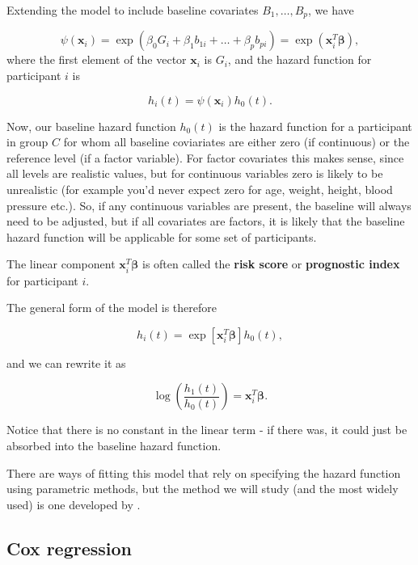 \documentclass[
  openany]{book}
\theoremstyle{definition}
\theoremstyle{definition}
\theoremstyle{definition}
\theoremstyle{definition}
\theoremstyle{remark}
\begin{document}
Extending the model to include baseline covariates \(B_1,\ldots,B_p\), we have

\[\psi\left(\mathbf{x}_i\right) = \exp\left(\beta_0 G_i + \beta_1b_{1i} + \ldots + \beta_p b_{pi}\right) = \exp\left(\mathbf{x}_i^T \boldsymbol\beta\right),\]
where the first element of the vector \(\mathbf{x}_i\) is \(G_i\), and the hazard function for participant \(i\) is

\[h_i\left(t\right) = \psi\left(\mathbf{x}_i\right)h_0\left(t\right). \]

Now, our baseline hazard function \(h_0\left(t\right)\) is the hazard function for a participant in group \(C\) for whom all baseline coviariates are either zero (if continuous) or the reference level (if a factor variable). For factor covariates this makes sense, since all levels are realistic values, but for continuous variables zero is likely to be unrealistic (for example you'd never expect zero for age, weight, height, blood pressure etc.). So, if any continuous variables are present, the baseline will always need to be adjusted, but if all covariates are factors, it is likely that the baseline hazard function will be applicable for some set of participants.

The linear component \(\mathbf{x}_i^T\boldsymbol\beta\) is often called the \textbf{risk score} or \textbf{prognostic index} for participant \(i\).

The general form of the model is therefore

\begin{equation}
h_i\left(t\right) = \exp\left[\mathbf{x}_i^T\boldsymbol\beta\right]h_0\left(t\right),
\label{eq:hazfun}
\end{equation}

and we can rewrite it as

\[\log\left(\frac{h_1\left(t\right)}{h_0\left(t\right)}\right) = \mathbf{x}_i^T\boldsymbol\beta.\]

Notice that there is no constant in the linear term - if there was, it could just be absorbed into the baseline hazard function.

There are ways of fitting this model that rely on specifying the hazard function using parametric methods, but the method we will study (and the most widely used) is one developed by \citet{cox1972regression}.

\hypertarget{coxreg}{%
\subsection{Cox regression}\label{coxreg}}
\end{document}
